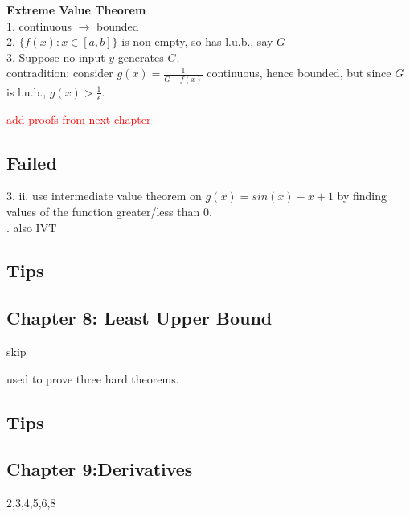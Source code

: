 \documentclass[a4paper, 12pt]{article}
\begin{document}
\textbf{ Extreme Value Theorem }\\
\textcolor[gray]{0.5}{1. continuous $\rightarrow$ bounded \\
2. $\{ f(x) : x \in [a, b]\}$ is non empty, so has l.u.b., say $G$\\
3. Suppose no input $y$ generates $G$. \\
    contradition: consider $g(x) = \frac{1}{G - f(x)}$ continuous, hence bounded, but since $G$ is l.u.b., $g(x) > \frac{1}{\epsilon}$.}
    
\textcolor{red}{add proofs from next chapter}

\medskip

\subsection*{Failed}
3. ii. use intermediate value theorem on $g(x) = sin(x) -x + 1$ by finding values of the function greater/less than $0$.\\

. also IVT
\subsection*{Tips}

\subsection*{Chapter 8: Least Upper Bound}
skip\\

used to prove three hard theorems.\\

\subsection*{Tips}


\subsection*{Chapter 9:Derivatives}
 2,3,4,5,6,8\\
 \medskip
\end{document}

